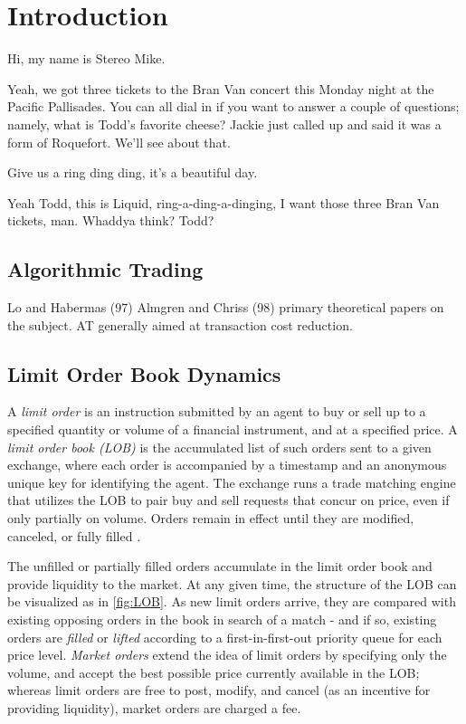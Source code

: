 \chapter{Introduction}

Hi, my name is Stereo Mike.

Yeah, we got three tickets to the Bran Van concert this Monday night at the Pacific Pallisades. You can all dial in if you want to answer a couple of questions; namely, what is Todd's favorite cheese? Jackie just called up and said it was a form of Roquefort. We'll see about that.

Give us a ring ding ding, it's a beautiful day.

Yeah Todd, this is Liquid, ring-a-ding-a-dinging, I want those three Bran Van tickets, man. Whaddya think? Todd?

\section{Algorithmic Trading}

Lo and Habermas (97)
Almgren and Chriss (98) 
primary theoretical papers on the subject. AT generally aimed at transaction cost reduction.

\section{Limit Order Book Dynamics}

A \emph{limit order} is an instruction submitted by an agent to buy or sell up to a specified quantity or volume of a financial instrument, and at a specified price. A \emph{limit order book (LOB)} is the accumulated list of such orders sent to a given exchange, where each order is accompanied by a timestamp and an anonymous unique key for identifying the agent. The exchange runs a trade matching engine that utilizes the LOB to pair buy and sell requests that concur on price, even if only partially on volume. Orders remain in effect until they are modified, canceled, or fully filled \cite{Kyle1989}.

The unfilled or partially filled orders accumulate in the limit order book and provide liquidity to the market. At any given time, the structure of the LOB can be visualized as in \autoref{fig:LOB}. As new limit orders arrive, they are compared with existing opposing orders in the book in search of a match - and if so, existing orders are \emph{filled} or \emph{lifted} according to a first-in-first-out priority queue for each price level. \emph{Market orders} extend the idea of limit orders by specifying only the volume, and accept the best possible price currently available in the LOB; whereas limit orders are free to post, modify, and cancel (as an incentive for providing liquidity), market orders are charged a fee.

